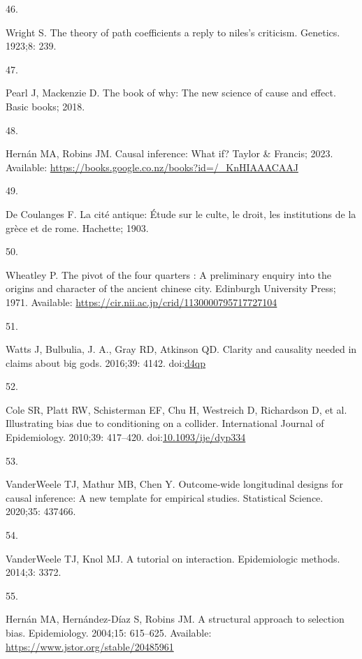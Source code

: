 \documentclass[
  singlecolumn]{article}
\newlength{\cslhangindent}
\newlength{\csllabelwidth}
\newlength{\cslentryspacingunit} %
\newenvironment{CSLReferences}[2] %
 {%
  \setlength{\parindent}{0pt}
  \ifodd #1
  \let\oldpar\par
  \def\par{\hangindent=\cslhangindent\oldpar}
  \fi
  \setlength{\parskip}{#2\cslentryspacingunit}
 }%
 {}
\newcommand{\CSLLeftMargin}[1]{\parbox[t]{\csllabelwidth}{#1}}
\newcommand{\CSLRightInline}[1]{\parbox[t]{\linewidth - \csllabelwidth}{#1}\break}
\begin{document}
\begin{CSLReferences}{0}{0}
\leavevmode{}%
\CSLLeftMargin{46. }%
\CSLRightInline{Wright S. The theory of path coefficients a reply to
niles's criticism. Genetics. 1923;8: 239. }

\leavevmode{}%
\CSLLeftMargin{47. }%
\CSLRightInline{Pearl J, Mackenzie D. The book of why: The new science
of cause and effect. Basic books; 2018. }

\leavevmode{}%
\CSLLeftMargin{48. }%
\CSLRightInline{Hernán MA, Robins JM. Causal inference: What if? Taylor
\& Francis; 2023. Available:
\url{https://books.google.co.nz/books?id=/_KnHIAAACAAJ}}

\leavevmode{}%
\CSLLeftMargin{49. }%
\CSLRightInline{De Coulanges F. La cité antique: Étude sur le culte, le
droit, les institutions de la grèce et de rome. Hachette; 1903. }

\leavevmode{}%
\CSLLeftMargin{50. }%
\CSLRightInline{Wheatley P. The pivot of the four quarters : A
preliminary enquiry into the origins and character of the ancient
chinese city. Edinburgh University Press; 1971. Available:
\url{https://cir.nii.ac.jp/crid/1130000795717727104}}

\leavevmode{}%
\CSLLeftMargin{51. }%
\CSLRightInline{Watts J, Bulbulia, J. A., Gray RD, Atkinson QD. Clarity
and causality needed in claims about big gods. 2016;39: 4142.
doi:\href{https://doi.org/d4qp}{d4qp}}

\leavevmode{}%
\CSLLeftMargin{52. }%
\CSLRightInline{Cole SR, Platt RW, Schisterman EF, Chu H, Westreich D,
Richardson D, et al. Illustrating bias due to conditioning on a
collider. International Journal of Epidemiology. 2010;39: 417--420.
doi:\href{https://doi.org/10.1093/ije/dyp334}{10.1093/ije/dyp334}}

\leavevmode{}%
\CSLLeftMargin{53. }%
\CSLRightInline{VanderWeele TJ, Mathur MB, Chen Y. Outcome-wide
longitudinal designs for causal inference: A new template for empirical
studies. Statistical Science. 2020;35: 437466. }

\leavevmode{}%
\CSLLeftMargin{54. }%
\CSLRightInline{VanderWeele TJ, Knol MJ. A tutorial on interaction.
Epidemiologic methods. 2014;3: 3372. }

\leavevmode{}%
\CSLLeftMargin{55. }%
\CSLRightInline{Hernán MA, Hernández-Díaz S, Robins JM. A structural
approach to selection bias. Epidemiology. 2004;15: 615--625. Available:
\url{https://www.jstor.org/stable/20485961}}


\end{CSLReferences}
\end{document}
